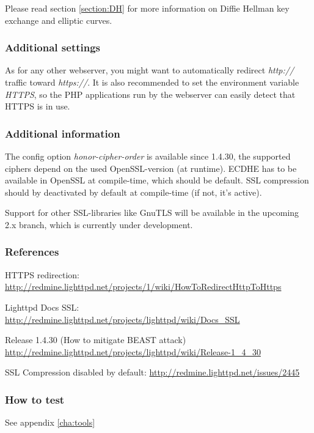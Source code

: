 
Please read section \ref{section:DH} for more information on Diffie Hellman key exchange and elliptic curves.

\subsubsection{Additional settings}
As for any other webserver, you might want to automatically redirect \emph{http://}
traffic toward \emph{https://}. It is also recommended to set the environment variable
\emph{HTTPS}, so the PHP applications run by the webserver can easily detect
that HTTPS is in use.


\subsubsection{Additional information}
The config option \emph{honor-cipher-order} is available since 1.4.30, the
supported ciphers depend on the used OpenSSL-version (at runtime). ECDHE has to
be available in OpenSSL at compile-time, which should be default. SSL
compression should by deactivated by default at compile-time (if not, it's
active).

Support for other SSL-libraries like GnuTLS will be available in the upcoming
2.x branch, which is currently under development.


\subsubsection{References}
\begin{itemize*}
  \item HTTPS redirection: \url{http://redmine.lighttpd.net/projects/1/wiki/HowToRedirectHttpToHttps}
  \item Lighttpd Docs SSL: \url{http://redmine.lighttpd.net/projects/lighttpd/wiki/Docs\_SSL}
  \item Release 1.4.30 (How to mitigate BEAST attack) \url{http://redmine.lighttpd.net/projects/lighttpd/wiki/Release-1\_4\_30}
  \item SSL Compression disabled by default: \url{http://redmine.lighttpd.net/issues/2445}
\end{itemize*}


\subsubsection{How to test}
See appendix \ref{cha:tools}


